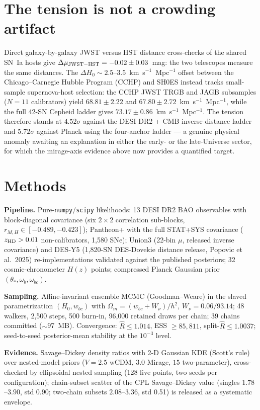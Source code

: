 \documentclass[11pt]{article}
\begin{document}
\section*{The tension is not a crowding artifact}

Direct galaxy-by-galaxy JWST versus HST distance cross-checks of the shared SN~Ia hosts give $\Delta\mu_{\rm JWST-HST} = -0.02 \pm 0.03$~mag: the two telescopes measure the same distances. The $\Delta H_0 \sim 2.5$--$3.5$~km~s$^{-1}$~Mpc$^{-1}$ offset between the Chicago--Carnegie Hubble Program (CCHP) and SH0ES instead tracks small-sample supernova-host selection: the CCHP JWST TRGB and JAGB subsamples ($N = 11$ calibrators) yield $68.81 \pm 2.22$ and $67.80 \pm 2.72$~km~s$^{-1}$~Mpc$^{-1}$, while the full 42-SN Cepheid ladder gives $73.17 \pm 0.86$~km~s$^{-1}$~Mpc$^{-1}$. The tension therefore stands at $4.52\sigma$ against the DESI DR2 + CMB inverse-distance ladder and $5.72\sigma$ against Planck using the four-anchor ladder --- a genuine physical anomaly awaiting an explanation in either the early- or the late-Universe sector, for which the mirage-axis evidence above now provides a quantified target.

\section*{Methods}

\textbf{Pipeline.} Pure-\texttt{numpy}/\texttt{scipy} likelihoods: 13 DESI DR2 BAO observables with block-diagonal covariance (six $2\times2$ correlation sub-blocks, $r_{M,H} \in [-0.489, -0.423]$); Pantheon+ with the full STAT+SYS covariance ($z_{\rm HD} > 0.01$ non-calibrators, 1{,}580 SNe); Union3 (22-bin $\mu$, released inverse covariance) and DES-Y5 (1{,}820-SN DES-Dovekie distance release, Popovic et al.~2025) re-implementations validated against the published posteriors; 32 cosmic-chronometer $H(z)$ points; compressed Planck Gaussian prior $(\theta_*, \omega_b, \omega_{bc})$.

\textbf{Sampling.} Affine-invariant ensemble MCMC (Goodman--Weare) in the slaved parametrization $(H_0, w_{bc})$ with $\Omega_m = (w_{bc} + W_\nu)/h^2$, $W_\nu = 0.06/93.14$; 48 walkers, 2{,}500 steps, 500 burn-in, 96{,}000 retained draws per chain; 39 chains committed ($\sim$97~MB). Convergence: $\widehat{R} \le 1.014$, ESS $\ge 85{,}811$, split-$\widehat{R} \le 1.0037$; seed-to-seed posterior-mean stability at the $10^{-3}$ level.

\textbf{Evidence.} Savage--Dickey density ratios with 2-D Gaussian KDE (Scott's rule) over nested-model priors ($V = 2.5$ wCDM, $3.0$ Mirage, $15$ two-parameter), cross-checked by ellipsoidal nested sampling (128 live points, two seeds per configuration); chain-subset scatter of the CPL Savage--Dickey value (singles $1.78$--$3.90$, std 0.90; two-chain subsets $2.08$--$3.36$, std 0.51) is released as a systematic envelope.
\end{document}
